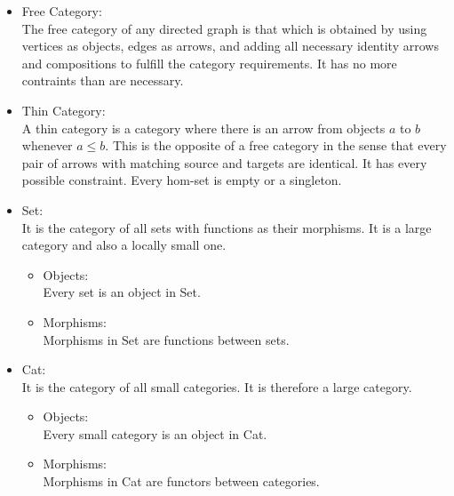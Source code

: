 \begin{itemize}
  \item Free Category:\\
    The free category of any directed graph is that which is obtained by using
    vertices as objects, edges as arrows, and adding all necessary identity
    arrows and compositions to fulfill the category requirements. It has no
    more contraints than are necessary.

  \item Thin Category:\\
    A thin category is a category where there is an arrow from objects $a$ to
    $b$ whenever $a \leq b$. This is the opposite of a free category in the
    sense that every pair of arrows with matching source and targets are
    identical. It has every possible constraint. Every hom-set is empty or a
    singleton.

  \item Set:\\
    It is the category of all sets with functions as their morphisms.
    It is a large category and also a locally small one. \parencite{awodey:category_theory}
    \begin{itemize}
      \item Objects:\\
        Every set is an object in Set.
      \item Morphisms:\\
        Morphisms in Set are functions between sets.
    \end{itemize}

  \item Cat:\\
    It is the category of all small categories. It is therefore a large category.
    \parencite{adamek_herrlich_strecker:joy_cats}
    \begin{itemize}
      \item Objects:\\
        Every small category is an object in Cat.
      \item Morphisms:\\
        Morphisms in Cat are functors between categories.
    \end{itemize}
\end{itemize}
